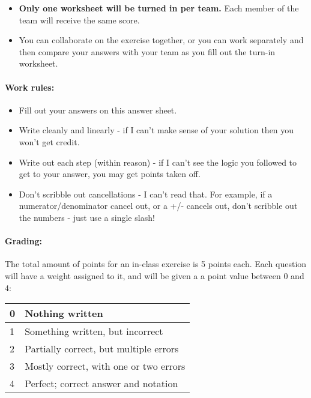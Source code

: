 \documentclass[a4paper,12pt]{book}
\begin{document}
    \begin{itemize}
        \item \textbf{Only one worksheet will be turned in per team.}
            Each member of the team will receive the same score.
        \item You can collaborate on the exercise together, or you can
            work separately and then compare your answers with your team
            as you fill out the turn-in worksheet.
    \end{itemize}

    \paragraph{Work rules:}

    \begin{itemize}
        \item Fill out your answers on this answer sheet.
        \item Write cleanly and linearly - if I can't make sense of
            your solution then you won't get credit.
        \item Write out each step (within reason) - if I can't see the
            logic you followed to get to your answer, you may get points taken off.
        \item Don't scribble out cancellations - I can't read that.
            For example, if a numerator/denominator cancel out, or a +/-
            cancels out, don't scribble out the numbers - just use a single slash!
    \end{itemize}

    \paragraph{Grading:}
        The total amount of points for an in-class exercise is 5 points each.
        Each question will have a weight assigned to it, and will be given
        a a point value between 0 and 4:

    \begin{center}
        \begin{tabular}{ | l | l | }
            \hline{}
            0 & Nothing written \\ \hline
            1 & Something written, but incorrect \\ \hline
            2 & Partially correct, but multiple errors \\ \hline
            3 & Mostly correct, with one or two errors \\ \hline
            4 & Perfect; correct answer and notation \\ \hline
            
        \end{tabular}
    \end{center}
    
\end{document}
